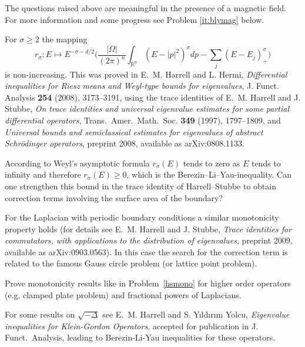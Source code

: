 \documentclass[12pt,letterpaper, reqno]{amsart}
\begin{document}
\begin{problem} 
 The questions raised above are meaningful in the presence of a magnetic field. For more information and some progress see Problem \eqref{it:blymag} below.
\end{problem}


\begin{problemblock}
For $\sigma\geq 2$ the mapping
\begin{equation*}
   r_{\sigma}: E\mapsto E^{-\sigma-d/2}\bigg(\frac{|\Omega|}{(2\pi)^n}\int_{\mathbb{R}^n}(E-|p|^2)^{\sigma}dp -\sum_j(E-E_j)_{+}^{\sigma}\bigg)
\end{equation*}
is non-increasing. This was proved in E.~M. Harrell and L. Hermi, \textit{Differential inequalities for
Riesz means and Weyl-type bounds for eigenvalues}, {J. Funct.
Analysis} \textbf{254} (2008), 3173--3191, using the trace identities of E.~M. Harrell and J. Stubbe, \textit{On trace identities and universal eigenvalue estimates for some partial differential
operators}, {Trans.\ Amer.\ Math.\ Soc.} \textbf{349} (1997),
1797--1809, and \textit{Universal bounds and
semiclassical estimates for eigenvalues of abstract Schr\"odinger
operators}, preprint 2008, available as arXiv:0808.1133.

\begin{problem}\label{hsmono}
According to Weyl's asymptotic formula
$r_{\sigma}(E)$ tends to zero as $E$ tends to infinity and
therefore $r_{\sigma}(E)\geq 0$, which is the
Berezin--Li--Yau-inequality. Can one strengthen this bound in the
trace identity of Harrell--Stubbe to obtain correction
terms involving the surface area of the boundary?
\end{problem}

 For the
Laplacian with periodic boundary conditions a similar monotonicity
property holds (for details see E.~M. Harrell and J. Stubbe, \textit{Trace identities for
commutators, with applications to the distribution of
eigenvalues}, preprint 2009, available as arXiv:0903.0563). In this case the
search for the correction term is related to the famous Gauss
circle problem (or lattice point problem).
\end{problemblock}


\begin{problemblock}

\begin{problem}
Prove monotonicity results like in Problem~\ref{hsmono} for higher
order operators (e.g. clamped plate problem) and fractional powers
of Laplacians.
\end{problem}

For some results on $\sqrt{-\Delta}$ see E.~M.
Harrell and S. Y{\i}ld{\i}r{\i}m Yolcu, \emph{Eigenvalue
inequalities for Klein-Gordon Operators}, accepted for publication
in J. Funct.\ Analysis, leading to Berezin-Li-Yau inequalities for
these operators.

\end{problemblock}
\end{document}
